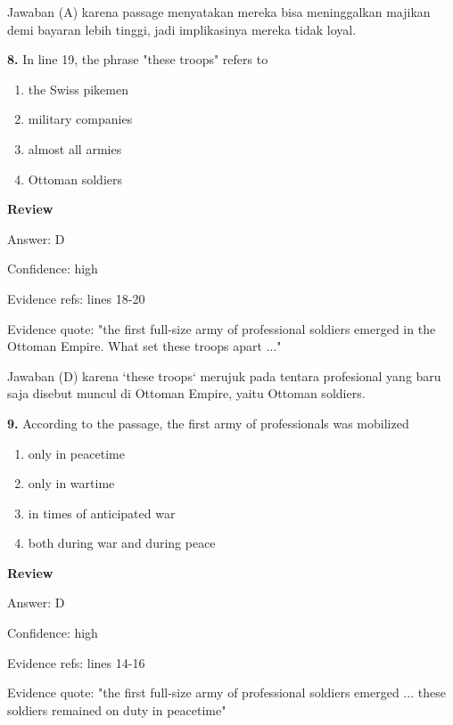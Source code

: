 \documentclass[12pt]{article}
\begin{document}
Jawaban (A) karena passage menyatakan mereka bisa meninggalkan majikan demi bayaran lebih tinggi, jadi implikasinya mereka tidak loyal.\par
\endgroup
\par
\vspace{0.25\baselineskip}
\noindent\textbf{8.} In line 19, the phrase "these troops" refers to
\begin{enumerate}[label=(\Alph*),leftmargin=*,itemsep=0.2em]
\item the Swiss pikemen
\item military companies
\item almost all armies
\item Ottoman soldiers
\end{enumerate}
\par
\begingroup
\setlength{\parskip}{0pt}
\setlength{\parindent}{0pt}
\textbf{Review}\par
Answer: D\par
Confidence: high\par
Evidence refs: lines 18-20\par
Evidence quote: "the first full-size army of professional soldiers emerged in the Ottoman Empire. What set these troops apart ..."\par
Jawaban (D) karena `these troops` merujuk pada tentara profesional yang baru saja disebut muncul di Ottoman Empire, yaitu Ottoman soldiers.\par
\endgroup
\par
\vspace{0.25\baselineskip}
\noindent\textbf{9.} According to the passage, the first army of professionals was mobilized
\begin{enumerate}[label=(\Alph*),leftmargin=*,itemsep=0.2em]
\item only in peacetime
\item only in wartime
\item in times of anticipated war
\item both during war and during peace
\end{enumerate}
\par
\begingroup
\setlength{\parskip}{0pt}
\setlength{\parindent}{0pt}
\textbf{Review}\par
Answer: D\par
Confidence: high\par
Evidence refs: lines 14-16\par
Evidence quote: "the first full-size army of professional soldiers emerged ... these soldiers remained on duty in peacetime"\par
\end{document}
